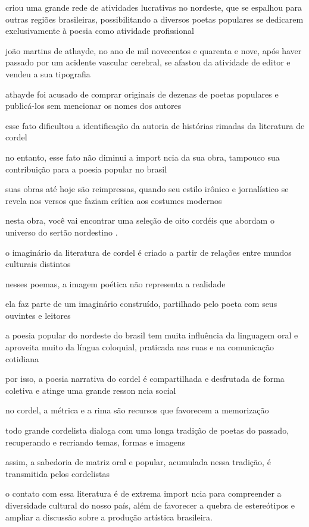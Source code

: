 criou uma grande rede de atividades lucrativas no nordeste, que se espalhou para outras regiões brasileiras, possibilitando a diversos poetas populares se dedicarem exclusivamente à poesia como atividade profissional

joão martins de athayde, no ano de mil novecentos e quarenta e nove, após haver passado por um acidente vascular cerebral, se afastou da atividade de editor e vendeu a sua tipografia 

athayde foi acusado de comprar originais de dezenas de poetas populares e publicá-los sem mencionar os nomes dos autores

esse fato dificultou a identificação da autoria de histórias rimadas da literatura de cordel

no entanto, esse fato não diminui a import ncia da sua obra, tampouco sua contribuição para a poesia popular no brasil

suas obras até hoje são reimpressas, quando seu estilo irônico e jornalístico se revela nos versos que faziam crítica aos costumes modernos

nesta obra,  você vai encontrar uma seleção de oito cordéis  que abordam o universo do sertão nordestino .

o imaginário da literatura de cordel  é criado a partir de relações entre mundos culturais distintos  

nesses poemas,  a imagem poética não representa a realidade 

ela faz parte de um imaginário construído,  partilhado pelo  poeta  com seus ouvintes e leitores 

a poesia popular do nordeste do brasil  tem muita influência da linguagem oral  e  aproveita muito da língua coloquial,  praticada nas ruas e na comunicação cotidiana  

por isso,  a poesia narrativa do cordel  é compartilhada e desfrutada de forma coletiva  e atinge uma grande resson ncia social  

no cordel,  a métrica e a rima são recursos que favorecem a memorização 

todo grande cordelista dialoga com uma longa tradição de poetas do passado,  recuperando e recriando  temas,  formas  e imagens 

assim,  a sabedoria de matriz oral e popular,  acumulada nessa tradição,  é transmitida pelos cordelistas 

o contato com essa literatura  é de extrema import ncia para compreender  a diversidade cultural do nosso país,  além de favorecer a quebra de estereótipos  e ampliar a discussão sobre a produção artística brasileira. 

